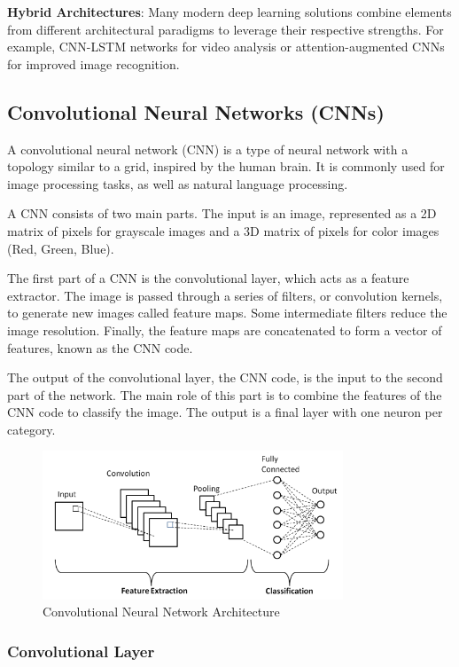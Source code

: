 \textbf{Hybrid Architectures}:
Many modern deep learning solutions combine elements from different architectural paradigms to leverage their respective strengths. For example, CNN-LSTM networks for video analysis or attention-augmented CNNs for improved image recognition.

\subsection{Convolutional Neural Networks (CNNs)}
\label{sec:cnn}
A convolutional neural network (CNN) is a type of neural network with a topology similar to a grid, inspired by the human brain. It is commonly used for image processing tasks, as well as natural language processing.

A CNN consists of two main parts. The input is an image, represented as a 2D matrix of pixels for grayscale images and a 3D matrix of pixels for color images (Red, Green, Blue).

The first part of a CNN is the convolutional layer, which acts as a feature extractor. The image is passed through a series of filters, or convolution kernels, to generate new images called feature maps. Some intermediate filters reduce the image resolution. Finally, the feature maps are concatenated to form a vector of features, known as the CNN code.

The output of the convolutional layer, the CNN code, is the input to the second part of the network. The main role of this part is to combine the features of the CNN code to classify the image. The output is a final layer with one neuron per category.
\begin{figure}[H]
  \centering
  \includegraphics[width=0.8\textwidth]{Images/Chapter1/cnn.png}
  \caption{Convolutional Neural Network Architecture \cite{phung2019high}}
  \label{fig:cnn}
\end{figure}

\subsubsection{Convolutional Layer}
\label{sec:conv}

